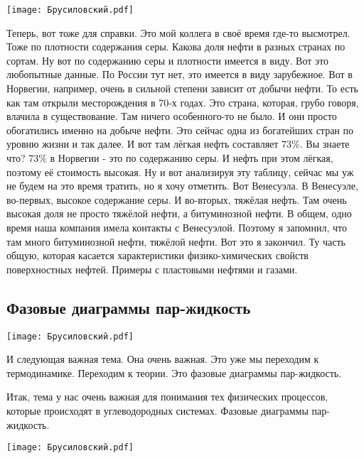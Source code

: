 \documentclass[main.tex]{subfiles}
\begin{document}
\begin{center}
\texttt{[image: Брусиловский.pdf]}
\end{center}

Теперь, вот тоже для справки.
Это мой коллега в своё время где-то высмотрел.
Тоже по плотности содержания серы.
Какова доля нефти в разных странах по сортам.
Ну вот по содержанию серы и плотности имеется в виду.
Вот это любопытные данные.
По России тут нет, это имеется в виду зарубежное.
Вот в Норвегии, например, очень в сильной степени зависит от добычи нефти.
То есть как там открыли месторождения в 70-х годах.
Это страна, которая, грубо говоря, влачила в существование.
Там ничего особенного-то не было.
И они просто обогатились именно на добыче нефти.
Это сейчас одна из богатейших стран по уровню жизни и так далее.
И вот там лёгкая нефть составляет 73\%.
Вы знаете что?
73\% в Норвегии - это по содержанию серы.
И нефть при этом лёгкая, поэтому её стоимость высокая.
Ну и вот анализируя эту таблицу, сейчас мы уж не будем на это время тратить, но я хочу отметить.
Вот Венесуэла.
В Венесуэле, во-первых, высокое содержание серы.
И во-вторых, тяжёлая нефть.
Там очень высокая доля не просто тяжёлой нефти, а битуминозной нефти.
В общем, одно время наша компания имела контакты с Венесуэлой.
Поэтому я запомнил, что там много битуминозной нефти, тяжёлой нефти.
Вот это я закончил.
Ту часть общую, которая касается характеристики физико-химических свойств поверхностных нефтей.
Примеры с пластовыми нефтями и газами.

\subsection{Фазовые диаграммы пар-жидкость}

\begin{center}
\texttt{[image: Брусиловский.pdf]}
\end{center}

И следующая важная тема.
Она очень важная.
Это уже мы переходим к термодинамике.
Переходим к теории.
Это фазовые диаграммы пар-жидкость.

Итак, тема у нас очень важная для понимания тех физических процессов, которые происходят в углеводородных системах.
Фазовые диаграммы пар-жидкость.

\begin{center}
\texttt{[image: Брусиловский.pdf]}
\end{center}
\end{document}
